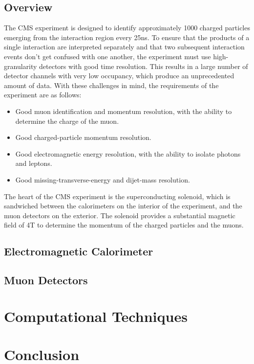 \documentclass[12pt]{article}
\begin{document}
\subsection{Overview}
The CMS experiment is designed to identify approximately 1000 charged particles emerging from the interaction region every 25ns. To ensure that the products of a single interaction are interpreted separately and that two subsequent interaction events don't get confused with one another, the experiment must use high-granularity detectors with good time resolution. This results in a large number of detector channels with very low occupancy, which produce an unprecedented amount of data. With these challenges in mind, the requirements of the experiment are as follows:
\begin{itemize}
\item Good muon identification and momentum resolution, with the ability to determine the charge of the muon.
\item Good charged-particle momentum resolution.
\item Good electromagnetic energy resolution, with the ability to isolate photons and leptons.
\item Good missing-transverse-energy and dijet-mass resolution.
\end{itemize}
\noindent
The heart of the CMS experiment is the superconducting solenoid, which is sandwiched between the calorimeters on the interior of the experiment, and the muon detectors on the exterior. The solenoid provides a substantial magnetic field of 4T to determine the momentum of the charged particles and the muons.
\subsection{Electromagnetic Calorimeter}
\subsection{Muon Detectors}


\section{Computational Techniques}
\label{comp_tech}
\section{Conclusion}





\end{document}
